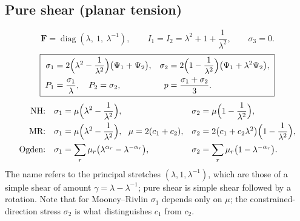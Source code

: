 \documentclass[11pt]{article}
\newcommand{\bF}{\bm{F}}
\newcommand{\Ione}{I_1}
\newcommand{\Itwo}{I_2}
\newcommand{\Pone}{\Psi_{1}}
\newcommand{\Ptwo}{\Psi_{2}}
\begin{document}
\subsection{Pure shear (planar tension)}
\begin{equation}
  \bF = \operatorname{diag}(\lambda,\ 1,\ \lambda^{-1}), \qquad
  \Ione = \Itwo = \lambda^2 + 1 + \frac1{\lambda^2}, \qquad
  \sigma_3 = 0 .
\end{equation}
\begin{equation}
  \boxed{\;
  \begin{aligned}
  \sigma_1 &= 2\Bigl(\lambda^2 - \frac1{\lambda^2}\Bigr)\bigl(\Pone + \Ptwo\bigr), &
  \sigma_2 &= 2\Bigl(1 - \frac1{\lambda^2}\Bigr)\bigl(\Pone + \lambda^2\Ptwo\bigr), \\
  P_1 &= \frac{\sigma_1}{\lambda},\quad P_2 = \sigma_2, &
  p &= \frac{\sigma_1 + \sigma_2}{3}.
  \end{aligned}\;}
  \label{eq:pureshear}
\end{equation}
\begin{align}
  \text{NH:}\quad & \sigma_1 = \mu\Bigl(\lambda^2 - \frac1{\lambda^2}\Bigr), &
  \sigma_2 &= \mu\Bigl(1 - \frac1{\lambda^2}\Bigr), \\
  \text{MR:}\quad & \sigma_1 = \mu\Bigl(\lambda^2 - \frac1{\lambda^2}\Bigr),\ \ \mu = 2(c_1 + c_2), &
  \sigma_2 &= 2\bigl(c_1 + c_2\lambda^2\bigr)\Bigl(1 - \frac1{\lambda^2}\Bigr), \\
  \text{Ogden:}\quad & \sigma_1 = \sum_r\mu_r\bigl(\lambda^{\alpha_r} - \lambda^{-\alpha_r}\bigr), &
  \sigma_2 &= \sum_r\mu_r\bigl(1 - \lambda^{-\alpha_r}\bigr).
\end{align}
The name refers to the principal stretches $(\lambda, 1, \lambda^{-1})$,
which are those of a simple shear of amount $\gamma = \lambda - \lambda^{-1}$;
pure shear is simple shear followed by a rotation.  Note that for
Mooney--Rivlin $\sigma_1$ depends only on $\mu$; the constrained-direction
stress $\sigma_2$ is what distinguishes $c_1$ from $c_2$.
\end{document}
